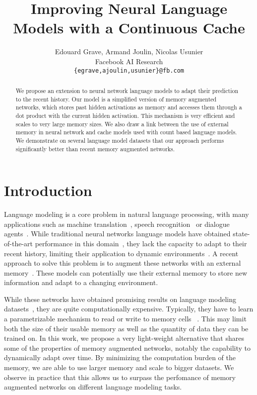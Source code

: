 \documentclass{article} \usepackage{iclr2017_conference,times}
\title{Improving Neural Language Models with a Continuous Cache}
\author{Edouard Grave, Armand Joulin, Nicolas Usunier \\
        Facebook AI Research \\
        \texttt{\{egrave,ajoulin,usunier\}@fb.com}}
\begin{document}
\maketitle

\begin{abstract}
We propose an extension to neural network language models to
adapt their prediction to the recent history. Our model
is a simplified version of memory augmented networks, which stores
past hidden activations as memory and accesses them through a dot product
with the current hidden activation. This mechanism is very efficient
and scales to very large memory sizes. We also draw a link between
the use of external memory in neural network and cache models used
with count based language models. We demonstrate on several language
model datasets that our approach performs significantly better than
recent memory augmented networks.
\end{abstract}

\section{Introduction}

Language modeling is a core problem in natural language
processing, with many applications such as machine
translation~\citep{brown1993mathematics}, speech
recognition~\citep{bahl1983maximum} or dialogue
agents~\citep{stolcke2000dialogue}.  While traditional neural networks language
models have obtained state-of-the-art performance in this
domain~\citep{jozefowicz2016exploring,mikolov2010recurrent}, they lack
the capacity to adapt to their recent history, limiting their application to
dynamic environments~\citep{dodge2015evaluating}. A recent
approach to solve this problem is to augment these networks with an external
memory~\citep{graves2014neural,grefenstette2015learning,joulin2015inferring,sukhbaatar2015end}.
These models can potentially use their external memory to store new
information and adapt to a changing environment.

While these networks have obtained promising results on
language modeling datasets~\citep{sukhbaatar2015end}, they are quite
computationally expensive. Typically, they have to learn a parametrizable
mechanism to read or write to memory cells ~\citep{graves2014neural,joulin2015inferring}.
This may limit both the size of their usable memory 
as well as the quantity of data they can be trained on. In this work, we
propose a very light-weight alternative that shares some of the properties of
memory augmented networks, notably the capability to dynamically adapt over time.
By minimizing the computation burden of the memory, we are able to use larger
memory and scale to bigger datasets. We observe in practice that this allows
us to surpass the perfomance of memory augmented networks on different language
modeling tasks.
\end{document}
